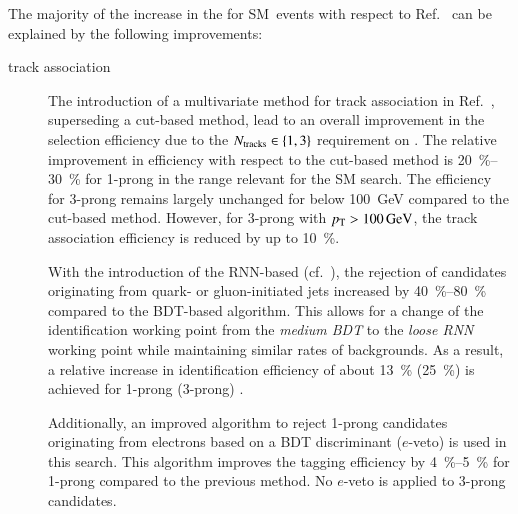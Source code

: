 The majority of the increase in the \AccTimesEff for SM~\HH events with respect
to Ref.~\cite{HIGG-2016-16-witherratum} can be explained by the following
improvements:
\begin{description}

\item[\tauhadvis track association] The introduction of a multivariate method
  for \tauhadvis track association in Ref.~\cite{duschinger}, superseding a
  cut-based method, lead to an overall improvement in the \tauhadvis selection
  efficiency due to the $N_{\text{tracks}} \in \{1, 3\}$ requirement on \tauhadvis. The
  relative improvement in efficiency with respect to the cut-based method is
  \SIrange[range-units=single]{20}{30}{\percent} for 1-prong \tauhadvis in the \tauhadvis \pT range
  relevant for the SM \HH search.
  The efficiency for 3-prong \tauhadvis remains largely unchanged for \tauhadvis
  \pT below \SI{100}{\GeV} compared to the cut-based method. However, for
  3-prong \tauhadvis with $\pT > \SI{100}{\GeV}$, the track association
  efficiency is reduced by up to \SI{10}{\percent}.

\item[\Tauid] With the introduction of the RNN-based \tauid
  (cf.~), the rejection of \tauhadvis candidates originating
  from quark- or gluon-initiated jets increased by \SIrange[range-units=single]{40}{80}{\percent}
  compared to the BDT-based algorithm. This allows for a change of the
  identification working point from the \emph{medium BDT} to the \emph{loose
    RNN} working point while maintaining similar rates of \faketauhadvisC
  backgrounds. As a result, a relative increase in \tauhadvis identification
  efficiency of about \SI{13}{\percent} (\SI{25}{\percent}) is achieved for
  1-prong (3-prong) \tauhadvis.

  Additionally, an improved algorithm to reject 1-prong \tauhadvis candidates
  originating from electrons based on a BDT discriminant ($e$-veto) is used
  in this search. This algorithm improves the tagging efficiency by
  \SIrange[range-units=single]{4}{5}{\percent} for 1-prong \tauhadvis compared to the previous
  method. No $e$-veto is applied to 3-prong \tauhadvis candidates.



\end{description}
